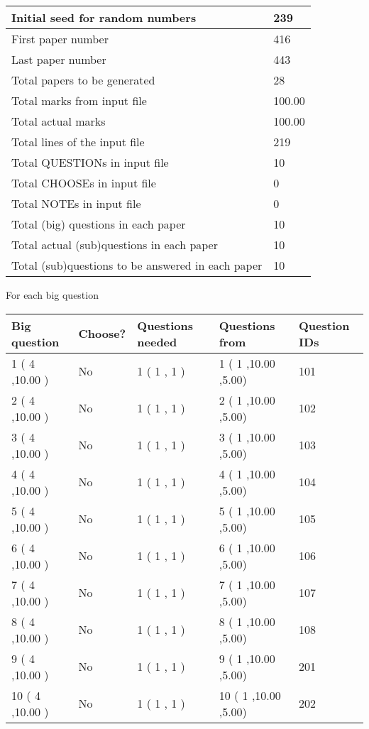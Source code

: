 \documentclass{ctexart}
\begin{document}
 \begin{tabular}{|l|l|}
 \hline
 Initial seed for random numbers & 239  \\
\hline
 First paper number & 416  \\
\hline
 Last  paper number & 443  \\
\hline
 Total papers to be generated & 28  \\
\hline
Total marks from input file & 100.00 \\
\hline
Total actual marks & 100.00 \\
\hline
 Total lines of the input file & 219  \\
 \hline
 Total QUESTIONs in input file & 10  \\
\hline
 Total CHOOSEs in input file & 0  \\
\hline
 Total NOTEs in input file & 0  \\
\hline
 Total (big) questions in each paper & 10  \\
\hline
 Total actual (sub)questions in each paper & 10  \\
\hline
 Total (sub)questions to be answered in each paper & 10  \\
\hline
 \end{tabular}
   
   
 \newpage
   
{\LARGE{For each big question}}
   
   
\vspace{0.2in}
   
   
\noindent\hspace{-0.4in}\begin{tabular}{|l|l|l|l|l|}
\hline
 Big question & Choose? & Questions needed & Questions from & Question IDs \\ 
\hline
 1 ( 4 ,10.00
 ) &  No   & 
 1 ( 1 ,  1 ) &  1 ( 1
,10.00
 ,5.00) &  101  \\
 \hline
 2 ( 4 ,10.00
 ) &  No   & 
 1 ( 1 ,  1 ) &  2 ( 1
,10.00
 ,5.00) &  102  \\
 \hline
 3 ( 4 ,10.00
 ) &  No   & 
 1 ( 1 ,  1 ) &  3 ( 1
,10.00
 ,5.00) &  103  \\
 \hline
 4 ( 4 ,10.00
 ) &  No   & 
 1 ( 1 ,  1 ) &  4 ( 1
,10.00
 ,5.00) &  104  \\
 \hline
 5 ( 4 ,10.00
 ) &  No   & 
 1 ( 1 ,  1 ) &  5 ( 1
,10.00
 ,5.00) &  105  \\
 \hline
 6 ( 4 ,10.00
 ) &  No   & 
 1 ( 1 ,  1 ) &  6 ( 1
,10.00
 ,5.00) &  106  \\
 \hline
 7 ( 4 ,10.00
 ) &  No   & 
 1 ( 1 ,  1 ) &  7 ( 1
,10.00
 ,5.00) &  107  \\
 \hline
 8 ( 4 ,10.00
 ) &  No   & 
 1 ( 1 ,  1 ) &  8 ( 1
,10.00
 ,5.00) &  108  \\
 \hline
 9 ( 4 ,10.00
 ) &  No   & 
 1 ( 1 ,  1 ) &  9 ( 1
,10.00
 ,5.00) &  201  \\
 \hline
 10 ( 4 ,10.00
 ) &  No   & 
 1 ( 1 ,  1 ) &  10 ( 1
,10.00
 ,5.00) &  202  \\
 \hline
 \end{tabular}
 
 
\end{document}
